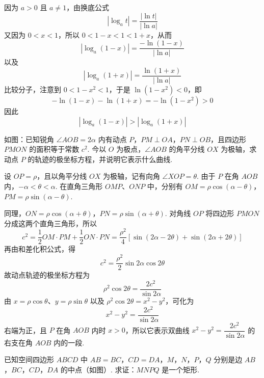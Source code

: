 \begin{solution}
因为 \(a>0\) 且 \(a\neq1\)，由换底公式
\[
\left|\log_a t\right|=\dfrac{|\ln t|}{|\ln a|}
\]
又因为 \(0<x<1\)，所以 \(0<1-x<1<1+x\)，从而
\[
\left|\log_a(1-x)\right|=\dfrac{-\ln(1-x)}{|\ln a|}
\]
以及
\[
\left|\log_a(1+x)\right|=\dfrac{\ln(1+x)}{|\ln a|}
\]
比较分子，注意到 \(0<1-x^2<1\)，于是 \(\ln(1-x^2)<0\)，即
\[
-\ln(1-x)-\ln(1+x)=-\ln(1-x^2)>0
\]
因此
\[
\left|\log_a(1-x)\right|>\left|\log_a(1+x)\right|
\]
\end{solution}

\begin{problem}

如图：已知锐角 \(\angle AOB=2\alpha\) 内有动点 \(P\)，\(PM\perp OA\)，\(PN\perp OB\)，且四边形 \(PMON\) 的面积等于常数 \(c^2\). 今以 \(O\) 为极点，\(\angle AOB\) 的角平分线 \(OX\) 为极轴，求动点 \(P\) 的轨迹的极坐标方程，并说明它表示什么曲线.

\end{problem}

\begin{solution}
设 \(OP=\rho\)，且以角平分线 \(OX\) 为极轴，记有向角 \(\angle XOP=\theta\). 由于 \(P\) 在角 \(AOB\) 内，\(-\alpha<\theta<\alpha\). 在直角三角形 \(OMP\)、\(ONP\) 中，分别有 \(OM=\rho\cos(\alpha-\theta)\)，\(PM=\rho\sin(\alpha-\theta)\).

同理，\(ON=\rho\cos(\alpha+\theta)\)，\(PN=\rho\sin(\alpha+\theta)\).
对角线 \(OP\) 将四边形 \(PMON\) 分成这两个直角三角形，所以
\[
c^2=\dfrac12OM\cdot PM+\dfrac12ON\cdot PN
=\dfrac{\rho^2}{4}\left[\sin(2\alpha-2\theta)+\sin(2\alpha+2\theta)\right]
\]
再由和差化积公式，得
\[
c^2=\dfrac{\rho^2}{2}\sin2\alpha\cos2\theta
\]
故动点轨迹的极坐标方程为
\[
\rho^2\cos2\theta=\dfrac{2c^2}{\sin2\alpha}
\]
由 \(x=\rho\cos\theta\)、\(y=\rho\sin\theta\) 以及 \(\rho^2\cos2\theta=x^2-y^2\)，可化为
\[
x^2-y^2=\dfrac{2c^2}{\sin2\alpha}
\]
右端为正，且 \(P\) 在角 \(AOB\) 内时 \(x>0\)，所以它表示双曲线 \(x^2-y^2=\dfrac{2c^2}{\sin2\alpha}\) 的右支在角 \(AOB\) 内的一段.
\end{solution}

\begin{problem}

已知空间四边形 \(ABCD\) 中 \(AB=BC\)，\(CD=DA\)，\(M\)，\(N\)，\(P\)，\(Q\) 分别是边 \(AB\)，\(BC\)，\(CD\)，\(DA\) 的中点（如图）. 求证：\(MNPQ\) 是一个矩形.

\begin{center}
\end{center}
\FloatBarrier
\end{problem}

